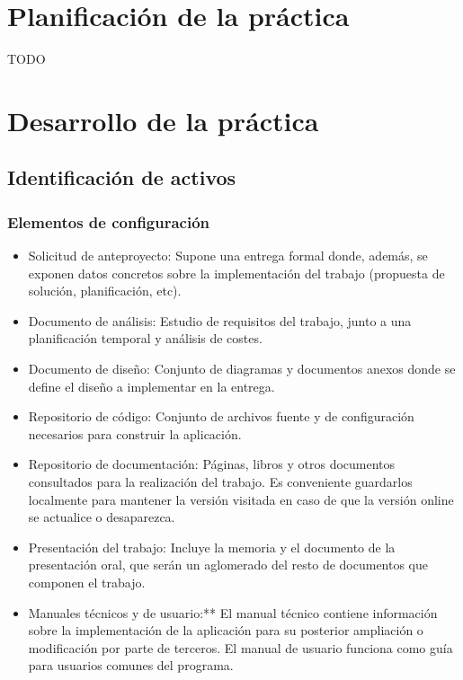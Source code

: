 \documentclass[10pt,a4paper]{article}
\begin{document}
	\section{Planificación de la práctica}
		TODO %
		
	\section{Desarrollo de la práctica}
		\subsection{Identificación de activos}
			\subsubsection{Elementos de configuración} 
			\begin{itemize}
                \item Solicitud de anteproyecto: Supone una entrega formal donde, además, se exponen datos concretos sobre la implementación del trabajo (propuesta de solución, planificación, etc).
                \item Documento de análisis: Estudio de requisitos del trabajo, junto a una planificación temporal y análisis de costes.
                \item Documento de diseño: Conjunto de diagramas y documentos anexos donde se define el diseño a implementar en la entrega.
                \item Repositorio de código: Conjunto de archivos fuente y de configuración necesarios para construir la aplicación.
                 \item Repositorio de documentación: Páginas, libros y otros documentos consultados para la realización del trabajo. Es conveniente guardarlos localmente para mantener la versión visitada en caso de que la versión online se actualice o desaparezca.
                 \item Presentación del trabajo: Incluye la memoria y el documento de la presentación oral, que serán un aglomerado del resto de documentos que componen el trabajo.
                 \item Manuales técnicos y de usuario:** El manual técnico contiene información sobre la implementación de la                         aplicación para su posterior ampliación o modificación por parte de terceros. El manual de usuario funciona como guía para usuarios comunes del programa.
            \end{itemize}
\end{document}
